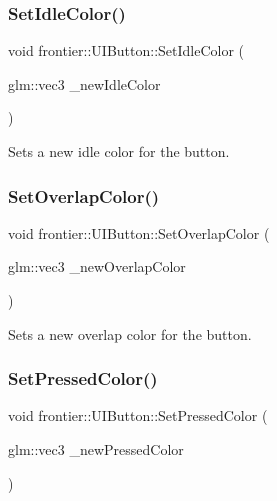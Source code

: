 \subsubsection{\texorpdfstring{Set\+Idle\+Color()}{SetIdleColor()}}
{\footnotesize\ttfamily void frontier\+::\+U\+I\+Button\+::\+Set\+Idle\+Color (\begin{DoxyParamCaption}\item[{glm\+::vec3}]{\+\_\+new\+Idle\+Color }\end{DoxyParamCaption})}



Sets a new idle color for the button. 

\mbox{\label{classfrontier_1_1_u_i_button_a3a71b90b88606a1eacb79fcb38eba42b}} 
\subsubsection{\texorpdfstring{Set\+Overlap\+Color()}{SetOverlapColor()}}
{\footnotesize\ttfamily void frontier\+::\+U\+I\+Button\+::\+Set\+Overlap\+Color (\begin{DoxyParamCaption}\item[{glm\+::vec3}]{\+\_\+new\+Overlap\+Color }\end{DoxyParamCaption})}



Sets a new overlap color for the button. 

\mbox{\label{classfrontier_1_1_u_i_button_a40ac28d611b1b30112bd8bff47ade5de}} 
\subsubsection{\texorpdfstring{Set\+Pressed\+Color()}{SetPressedColor()}}
{\footnotesize\ttfamily void frontier\+::\+U\+I\+Button\+::\+Set\+Pressed\+Color (\begin{DoxyParamCaption}\item[{glm\+::vec3}]{\+\_\+new\+Pressed\+Color }\end{DoxyParamCaption})}



